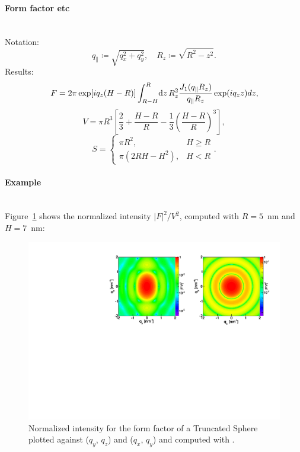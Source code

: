 \paragraph{Form factor etc}\strut\\
Notation:
\begin{equation*}
  q_{\parallel} \coloneqq \sqrt{q_x^2+q_y^2},\quad
  R_z \coloneqq \sqrt{R^2-z^2}.
\end{equation*}
Results:
\begin{equation*}  
F= 2\pi \exp[i q_z (H-R)]\int_{R-H}^{R}\!\text{d} z\, R_z^2
       \frac{J_1(q_{\parallel} R_z) }{q_{\parallel} R_z} \exp(i q_z z) dz,
\end{equation*}
\begin{equation*}
  V=\pi R^3 \left[\dfrac{2}{3} + \dfrac{H-R}{R} - \dfrac{1}{3}\left(\dfrac{H-R}{R}\right)^3\right],
\end{equation*}
\begin{equation*}
  S = \left\{\begin{array}{ll} \pi R^2, & H \geq R \\
         \pi\left(2RH-H^2\right), & H < R \end{array}\right..
\end{equation*}

\paragraph{Example}\strut\\
Figure~\ref{fig:SphereEx} shows the normalized intensity $|F|^2/V^2$, computed with $R=5$~nm and $H=7$~nm:
\begin{figure}[H]
\begin{center}
\includegraphics[angle=-90,width=\textwidth]{fig/ff/figffsphere.pdf}
\end{center}
\caption{Normalized intensity for the form factor of a Truncated Sphere plotted against ($q_y$, $q_z$) and ($q_x$, $q_y$) and
  computed with .}
\label{fig:SphereEx}
\end{figure}

